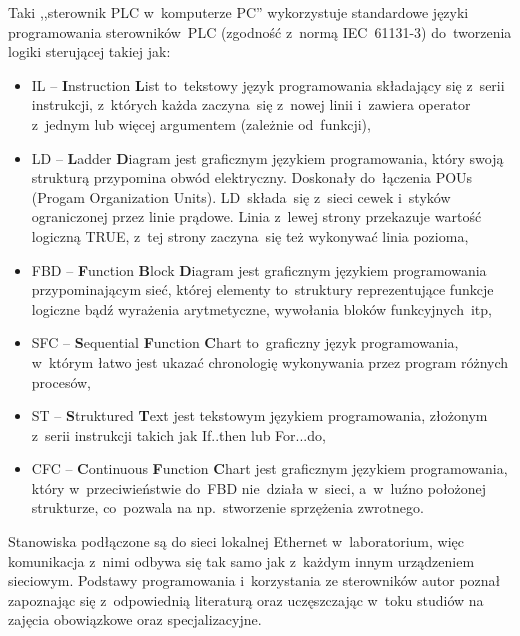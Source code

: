Taki ,,sterownik PLC w~komputerze PC'' wykorzystuje standardowe języki programowania sterowników~PLC (zgodność z~normą IEC~61131-3) do~tworzenia logiki sterującej takiej jak:
\begin{itemize}
\item IL -- \textbf{I}nstruction \textbf{L}ist to~tekstowy język programowania składający się z~serii instrukcji, z~których każda zaczyna~się z~nowej linii i~zawiera operator z~jednym lub więcej argumentem (zależnie od~funkcji),

\item LD -- \textbf{L}adder \textbf{D}iagram jest graficznym językiem programowania, który swoją strukturą przypomina obwód elektryczny. Doskonały do~łączenia POUs (Progam Organization Units). LD~składa~się z~sieci cewek i~styków ograniczonej przez linie prądowe. Linia z~lewej strony przekazuje wartość logiczną TRUE, z~tej strony zaczyna~się też wykonywać linia pozioma,

\item FBD -- \textbf{F}unction \textbf{B}lock \textbf{D}iagram jest graficznym językiem programowania przypominającym sieć, której elementy to~struktury reprezentujące funkcje logiczne bądź wyrażenia arytmetyczne, wywołania bloków funkcyjnych~itp,

\item SFC -- \textbf{S}equential \textbf{F}unction \textbf{C}hart to~graficzny język programowania, w~którym łatwo jest ukazać chronologię wykonywania przez program różnych procesów,

\item ST -- \textbf{S}truktured \textbf{T}ext jest tekstowym językiem programowania, złożonym z~serii instrukcji takich jak If..then lub For...do,

\item CFC -- \textbf{C}ontinuous \textbf{F}unction \textbf{C}hart jest graficznym językiem programowania, który w~przeciwieństwie do~FBD nie~działa w~sieci, a~w~luźno położonej strukturze, co~pozwala na np.~stworzenie sprzężenia zwrotnego.
\end{itemize}

\indent
\indent Stanowiska podłączone są do sieci lokalnej Ethernet w~laboratorium, więc komunikacja z~nimi odbywa się tak samo jak z~każdym innym urządzeniem sieciowym. Podstawy programowania i~korzystania ze sterowników autor poznał zapoznając się z~odpowiednią literaturą \cite{plc1,plc2,plc4,plc5,plc6} oraz uczęszczając w~toku studiów na zajęcia obowiązkowe oraz specjalizacyjne.

